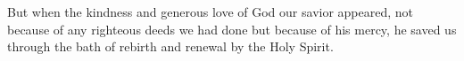 
\lettrine{B}{}ut when the kindness and generous love of God our savior appeared, not because of any righteous deeds we had done but because of his mercy, he saved us through the bath of rebirth and renewal by the Holy Spirit.